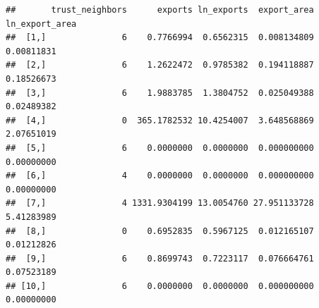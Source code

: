 \documentclass[]{book}
\newenvironment{Shaded}{\begin{snugshade}}{\end{snugshade}}
\newcommand{\CommentTok}[1]{\textcolor[rgb]{0.56,0.35,0.01}{\textit{#1}}}
\newcommand{\KeywordTok}[1]{\textcolor[rgb]{0.13,0.29,0.53}{\textbf{#1}}}
\newcommand{\NormalTok}[1]{#1}
\newcommand{\OperatorTok}[1]{\textcolor[rgb]{0.81,0.36,0.00}{\textbf{#1}}}
\newcommand{\StringTok}[1]{\textcolor[rgb]{0.31,0.60,0.02}{#1}}
\theoremstyle{definition}
\theoremstyle{definition}
\theoremstyle{definition}
\theoremstyle{remark}
\begin{document}
\begin{Shaded}
\begin{Highlighting}[]
\begin{Shaded}
\begin{Highlighting}[]
\begin{Shaded}
\end{Shaded}

\begin{verbatim}
##       trust_neighbors      exports ln_exports  export_area ln_export_area
##  [1,]               6    0.7766994  0.6562315  0.008134809     0.00811831
##  [2,]               6    1.2622472  0.9785382  0.194118887     0.18526673
##  [3,]               6    1.9883785  1.3804752  0.025049388     0.02489382
##  [4,]               0  365.1782532 10.4254007  3.648568869     2.07651019
##  [5,]               6    0.0000000  0.0000000  0.000000000     0.00000000
##  [6,]               4    0.0000000  0.0000000  0.000000000     0.00000000
##  [7,]               4 1331.9304199 13.0054760 27.951133728     5.41283989
##  [8,]               0    0.6952835  0.5967125  0.012165107     0.01212826
##  [9,]               6    0.8699743  0.7223117  0.076664761     0.07523189
## [10,]               6    0.0000000  0.0000000  0.000000000     0.00000000
\end{verbatim}

\begin{Shaded}
\end{Shaded}


\end{Highlighting}
\end{Shaded}
\end{Highlighting}
\end{Shaded}
\end{document}
